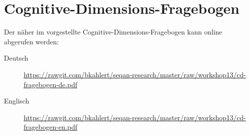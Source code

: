 \begin{center}
\end{center}


\vfill


\section{Cognitive-Dimensions-Fragebogen}
\label{app:cd-fragebogen}

Der näher im  vorgestellte Cognitive-Dimensions-Fragebogen kann online abgerufen werden:

\begin{description}
  \item[Deutsch] \url{https://rawgit.com/bkahlert/seqan-research/master/raw/workshop13/cd-fragebogen-de.pdf}
  \item[Englisch] \url{https://rawgit.com/bkahlert/seqan-research/master/raw/workshop13/cd-fragebogen-en.pdf}
\end{description}


